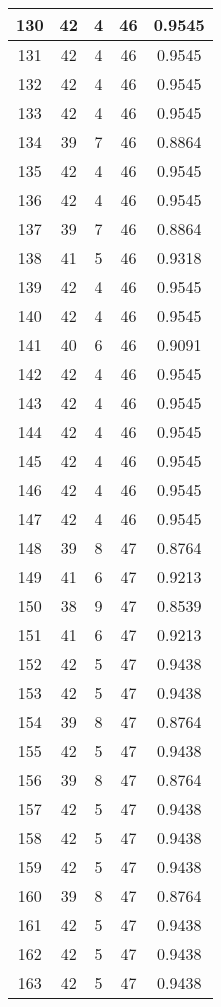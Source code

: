\documentclass[letterpaper, 12pt]{article}
\begin{document}
\begin{longtable}{|c|c|c|c|c|}
\hline
130 & 42 & 4 & 46 & 0.9545 \\
\hline
131 & 42 & 4 & 46 & 0.9545 \\
\hline
132 & 42 & 4 & 46 & 0.9545 \\
\hline
133 & 42 & 4 & 46 & 0.9545 \\
\hline
134 & 39 & 7 & 46 & 0.8864 \\
\hline
135 & 42 & 4 & 46 & 0.9545 \\
\hline
136 & 42 & 4 & 46 & 0.9545 \\
\hline
137 & 39 & 7 & 46 & 0.8864 \\
\hline
138 & 41 & 5 & 46 & 0.9318 \\
\hline
139 & 42 & 4 & 46 & 0.9545 \\
\hline
140 & 42 & 4 & 46 & 0.9545 \\
\hline
141 & 40 & 6 & 46 & 0.9091 \\
\hline
142 & 42 & 4 & 46 & 0.9545 \\
\hline
143 & 42 & 4 & 46 & 0.9545 \\
\hline
144 & 42 & 4 & 46 & 0.9545 \\
\hline
145 & 42 & 4 & 46 & 0.9545 \\
\hline
146 & 42 & 4 & 46 & 0.9545 \\
\hline
147 & 42 & 4 & 46 & 0.9545 \\
\hline
148 & 39 & 8 & 47 & 0.8764 \\
\hline
149 & 41 & 6 & 47 & 0.9213 \\
\hline
150 & 38 & 9 & 47 & 0.8539 \\
\hline
151 & 41 & 6 & 47 & 0.9213 \\
\hline
152 & 42 & 5 & 47 & 0.9438 \\
\hline
153 & 42 & 5 & 47 & 0.9438 \\
\hline
154 & 39 & 8 & 47 & 0.8764 \\
\hline
155 & 42 & 5 & 47 & 0.9438 \\
\hline
156 & 39 & 8 & 47 & 0.8764 \\
\hline
157 & 42 & 5 & 47 & 0.9438 \\
\hline
158 & 42 & 5 & 47 & 0.9438 \\
\hline
159 & 42 & 5 & 47 & 0.9438 \\
\hline
160 & 39 & 8 & 47 & 0.8764 \\
\hline
161 & 42 & 5 & 47 & 0.9438 \\
\hline
162 & 42 & 5 & 47 & 0.9438 \\
\hline
163 & 42 & 5 & 47 & 0.9438 \\

\end{longtable}
\end{document}
